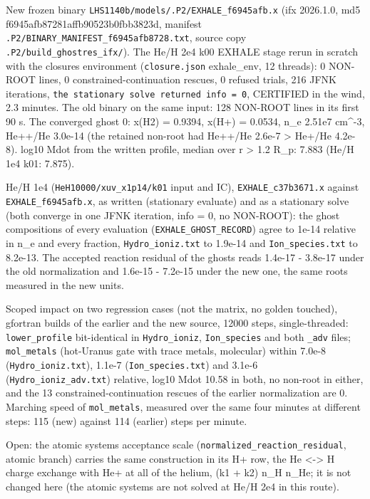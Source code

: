 \documentclass[english,a4paper]{my_memo}
\begin{document}
New frozen binary \texttt{LHS1140b/models/.P2/EXHALE\_f6945afb.x} (ifx 2026.1.0, md5
f6945afb87281affb90523b0fbb3823d, manifest \texttt{.P2/BINARY\_MANIFEST\_f6945afb8728.txt},
source copy \texttt{.P2/build\_ghostres\_ifx/}). The He/H 2e4 k00 EXHALE stage rerun
in scratch with the closure\textquotesingle s environment (\texttt{closure.json} exhale\_env, 12
threads): 0 NON-ROOT lines, 0 constrained-continuation rescues, 0 refused
trials, 216 JFNK iterations, \texttt{the\ stationary\ solve\ returned\ info\ =\ 0},
CERTIFIED in the wind, 2.3 minutes. The old binary on the same input: 128
NON-ROOT lines in its first 90 s. The converged ghost 0: x(H2) = 0.9394,
x(H+) = 0.0534, n\_e 2.51e7 cm\^{}-3, He++/He 3.0e-14 (the retained non-root had
He++/He 2.6e-7 \textgreater{} He+/He 4.2e-8). log10 Mdot from the written profile,
median over r \textgreater{} 1.2 R\_p: 7.883 (He/H 1e4 k01: 7.875).

He/H 1e4 (\texttt{HeH10000/xuv\_x1p14/k01} input and IC), \texttt{EXHALE\_c37b3671.x} against
\texttt{EXHALE\_f6945afb.x}, as written (stationary evaluate) and as a stationary
solve (both converge in one JFNK iteration, info = 0, no NON-ROOT): the ghost
compositions of every evaluation (\texttt{EXHALE\_GHOST\_RECORD}) agree to 1e-14
relative in n\_e and every fraction, \texttt{Hydro\_ioniz.txt} to 1.9e-14 and
\texttt{Ion\_species.txt} to 8.2e-13. The accepted reaction residual of the ghosts
reads 1.4e-17 - 3.8e-17 under the old normalization and 1.6e-15 - 7.2e-15
under the new one, the same roots measured in the new units.

Scoped impact on two regression cases (not the matrix, no golden touched),
gfortran builds of the earlier and the new source, 12000 steps,
single-threaded: \texttt{lower\_profile} bit-identical in \texttt{Hydro\_ioniz},
\texttt{Ion\_species} and both \texttt{\_adv} files; \texttt{mol\_metals} (hot-Uranus gate with
trace metals, molecular) within 7.0e-8 (\texttt{Hydro\_ioniz.txt}), 1.1e-7
(\texttt{Ion\_species.txt}) and 3.1e-6 (\texttt{Hydro\_ioniz\_adv.txt}) relative, log10 Mdot
10.58 in both, no non-root in either, and the 13 constrained-continuation
rescues of the earlier normalization are 0. Marching speed of \texttt{mol\_metals},
measured over the same four minutes at different steps: 115 (new) against
114 (earlier) steps per minute.

Open: the atomic systems\textquotesingle{} acceptance scale (\texttt{normalized\_reaction\_residual},
atomic branch) carries the same construction in its H+ row, the He \textless-\textgreater{} H
charge exchange with He+ at all of the helium, (k1 + k2) n\_H n\_He; it is not
changed here (the atomic systems are not solved at He/H 2e4 in this route).
\end{document}
